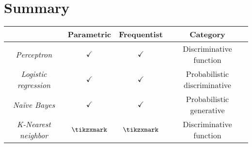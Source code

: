\section{Summary}
\begin{table}[H]
    \centering
    \begin{tabular}{c|ccc}
                                 & \textbf{Parametric} & \textbf{Frequentist} & \textbf{Category}            \\ \hline
    \textit{Perceptron}          & $\checkmark$        & $\checkmark$         & Discriminative function      \\
    \textit{Logistic regression} & $\checkmark$        & $\checkmark$         & Probabilistic discriminative \\
    \textit{Naïve Bayes}         & $\checkmark$        & $\checkmark$         & Probabilistic generative     \\
    \textit{K-Nearest neighbor}  & $\tikzxmark$        & $\tikzxmark$         & Discriminative function     
    \end{tabular}
\end{table}
